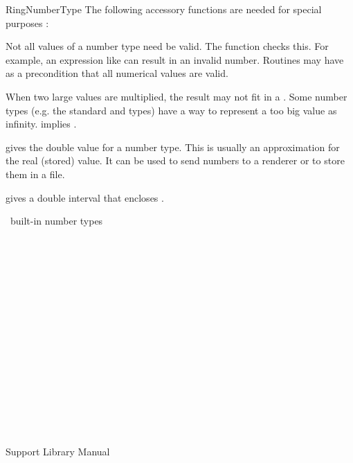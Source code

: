 \begin{ccRefConcept}{RingNumberType}
The following accessory functions are needed for special purposes :

{Not all values of a number type need be valid. The function
 checks this. For example, an expression like
 can result in an invalid number. Routines may
have as a precondition that all numerical values are valid.}

{ When two large values are multiplied, the result may not fit in a
  . 
  Some number types (e.g. the standard  and  types)
  have a way to represent a too big value as infinity.
   implies .}

         {gives the double value for a number type.
          This is usually an approximation for the real (stored) value.
          It can be used to send numbers to a renderer or to store them 
          in a file.}

         {gives a double interval that encloses .}

\ccHasModels

\CC\ built-in number types \\
 \\
 \\
 \\
 \\
 \\
 \\
 \\
 \\
 \\
 \\
 \\
 \\
 \\

\ccSeeAlso
{} \\
 \\
 \\
Support Library Manual

\end{ccRefConcept}
